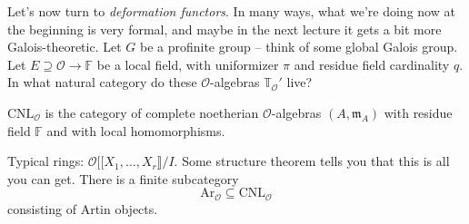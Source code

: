 \documentclass[reqno]{amsart} 
\numberwithin{theorem}{section}
\numberwithin{equation}{section}
\numberwithin{exercise}{section}
\begin{document}
Let's now turn to \emph{deformation functors}.  In many ways, what we're doing now at the beginning is very formal, and maybe in the next lecture it gets a bit more Galois-theoretic.  Let $G$ be a profinite group -- think of some global Galois group.  Let $E \supseteq \mathcal{O} \rightarrow \mathbb{F}$ be a local field, with uniformizer $\pi$ and residue field cardinality $q$.  In what natural category do these $\mathcal{O}$-algebras $\mathbb{T}_{\mathcal{O}}'$ live?
\begin{definition}\label{definition:cq6thpm6f8}
  $\mathrm{C N L }_{\mathcal{O}}$ is the category of complete noetherian $\mathcal{O}$-algebras $(A, \mathfrak{m}_{A})$ with residue field $\mathbb{F}$ and with local homomorphisms.
\end{definition}
Typical rings: $\mathcal{O} [[ X_1, \dotsc, X_r\rrbracket / I$.  Some structure theorem tells you that this is all you can get.  There is a finite subcategory
\begin{equation*}
  \mathrm{Ar}_{\mathcal{O}} \subseteq \mathrm{C N L}_{\mathcal{O}}
\end{equation*}
consisting of Artin objects.
\end{document}
